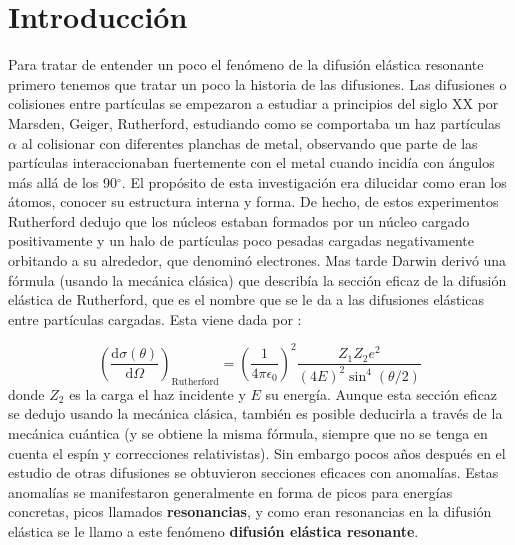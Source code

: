 \documentclass[fleqn,11pt]{SelfArx} %
\affiliation{\textsuperscript{1}\textit{Facultad de Física, Universidad Santiago de Compostela, Galicia, España}} %
\affiliation{*\textbf{Correo del autor}: danielvazquezlago@gmail.com, daniel.vazquez.lago@rai.usc.es} %
\newcommand{\parentesis}[1]{\left( #1  \right)}
\newcommand{\D}{\mathrm{d}}
\newcommand{\derivadas}[2]{\frac{\D #1}{\D #2}}
\begin{document}
\maketitle %

\tableofcontents %

\thispagestyle{empty} %


\setlength{\parskip}{1.5mm} %



\section{Introducción}

Para tratar de entender un poco el fenómeno de la difusión elástica resonante primero tenemos que tratar un poco la historia de las difusiones. Las difusiones o colisiones entre partículas se empezaron a estudiar a principios del siglo XX por Marsden, Geiger, Rutherford, estudiando como se comportaba un haz partículas $\alpha$ al colisionar con diferentes planchas de metal, observando que parte de las partículas interaccionaban fuertemente con el metal cuando incidía con ángulos más allá de los 90$^\circ$. El propósito de esta investigación era dilucidar como eran los átomos, conocer su estructura interna y forma. De hecho, de estos experimentos Rutherford dedujo que los núcleos estaban formados por un núcleo cargado positivamente y un halo de partículas poco pesadas cargadas negativamente orbitando a su alrededor, que denominó electrones. Mas tarde Darwin derivó una fórmula (usando la mecánica clásica) que describía la sección eficaz de la difusión elástica de Rutherford, que es el nombre que se le da a las difusiones elásticas entre partículas cargadas. Esta viene dada por \cite{FNyP}:

\begin{equation}
	\parentesis{\derivadas{\sigma(\theta)}{\Omega}}_{\text{Rutherford}} = \parentesis{\frac{1}{ 4 \pi \epsilon_0}}^2 \frac{Z_1Z_2 e^2}{(4E)^2\sin^4 (\theta/2)}
\end{equation}
donde $Z_2$ es la carga el haz incidente y $E$ su energía. Aunque esta sección eficaz se dedujo usando la mecánica clásica, también es posible deducirla a través de la mecánica cuántica (y se obtiene la misma fórmula, siempre que no se tenga en cuenta el espín y correcciones relativistas). Sin embargo pocos años después en el estudio de otras difusiones se obtuvieron secciones eficaces con anomalías. Estas anomalías se manifestaron generalmente en forma de picos para energías concretas, picos llamados \textbf{resonancias}, y como eran resonancias en la difusión elástica se le llamo a este fenómeno \textbf{difusión elástica resonante}.  
\end{document}
